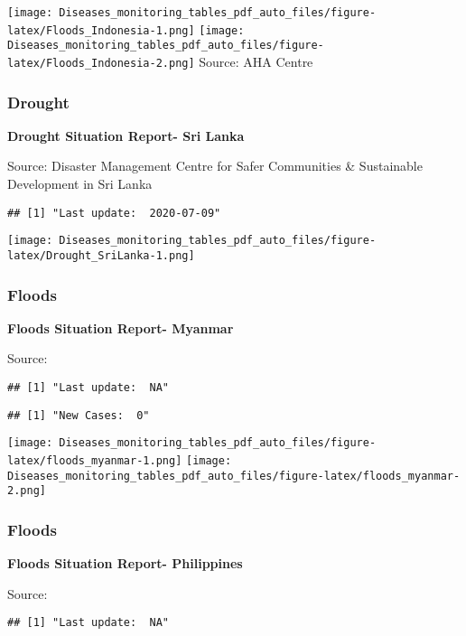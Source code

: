 \documentclass[]{article}
\begin{document}
\texttt{[image: Diseases\_monitoring\_tables\_pdf\_auto\_files/figure-latex/Floods\_Indonesia-1.png]}
\texttt{[image: Diseases\_monitoring\_tables\_pdf\_auto\_files/figure-latex/Floods\_Indonesia-2.png]}
Source: AHA Centre \pagebreak

\hypertarget{drought}{%
\subsubsection{Drought}\label{drought}}

\textbf{Drought Situation Report- Sri Lanka}

Source: Disaster Management Centre for Safer Communities \& Sustainable
Development in Sri Lanka

\begin{verbatim}
## [1] "Last update:  2020-07-09"
\end{verbatim}

\texttt{[image: Diseases\_monitoring\_tables\_pdf\_auto\_files/figure-latex/Drought\_SriLanka-1.png]}

\pagebreak

\hypertarget{floods-1}{%
\subsubsection{Floods}\label{floods-1}}

\textbf{Floods Situation Report- Myanmar}

Source:

\begin{verbatim}
## [1] "Last update:  NA"
\end{verbatim}

\begin{verbatim}
## [1] "New Cases:  0"
\end{verbatim}

\texttt{[image: Diseases\_monitoring\_tables\_pdf\_auto\_files/figure-latex/floods\_myanmar-1.png]}
\texttt{[image: Diseases\_monitoring\_tables\_pdf\_auto\_files/figure-latex/floods\_myanmar-2.png]}

\pagebreak

\hypertarget{floods-2}{%
\subsubsection{Floods}\label{floods-2}}

\textbf{Floods Situation Report- Philippines}

Source:

\begin{verbatim}
## [1] "Last update:  NA"
\end{verbatim}
\end{document}
